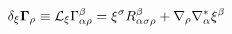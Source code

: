\begin{equation}
\delta _{\xi }{\bf \Gamma }_{\rho }\equiv {\cal L}_{\xi }\Gamma
_{\alpha \rho }^{\beta }=\xi ^{\sigma }R_{\alpha \sigma \rho
}^{\beta }+\nabla _{\rho }\nabla^*_{\alpha }\xi ^{\beta }
\label{yano}
\end{equation}

